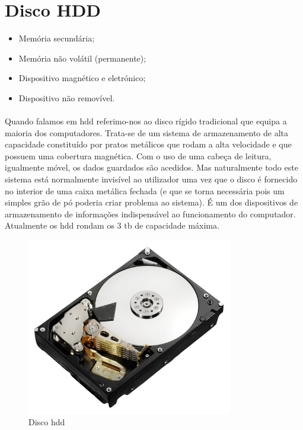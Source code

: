 \documentclass[a4paper]{report}
\begin{document}
\section{Disco HDD}
\label{sect.hdd}

\begin{itemize}
\item Memória secundária;
\item Memória não volátil (permanente);
\item Dispositivo magnético e eletrónico;
\item Dispositivo não removível.
\end{itemize}

\paragraph*{}Quando falamos em \ac{hdd} referimo-nos ao disco rígido tradicional que equipa a maioria dos computadores. Trata-se de um sistema de armazenamento de alta capacidade constituído por pratos metálicos que rodam a alta velocidade e que possuem uma cobertura magnética. Com o uso de uma cabeça de leitura, igualmente móvel, os dados guardados são acedidos. Mas naturalmente todo este sistema está normalmente invisível ao utilizador uma vez que o disco é fornecido no interior de uma caixa metálica fechada (e que se torna necessária pois um simples grão de pó poderia criar problema ao sistema). É um dos dispositivos de armazenamento de informações indispensável ao funcionamento do computador. Atualmente os \ac{hdd} rondam os 3 \ac{tb} de capacidade máxima.

\begin{figure}[H]
\center
\includegraphics[width=9cm]{Imagens/imagemdehdd.png}
\caption{Disco \ac{hdd}}
\end{figure}
\end{document}
